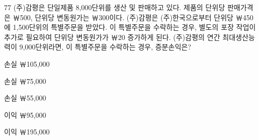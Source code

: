 \begin{question}{77}
(주)감평은 단일제품 8,000단위를 생산 및 판매하고 있다. 제품의 단위당 판매가격은 ￦500, 단위당 변동원가는 ￦300이다. (주)감평은 (주)한국으로부터 단위당 ￦450에 1,500단위의 특별주문을 받았다. 이 특별주문을 수락하는 경우, 별도의 포장 작업이 추가로 필요하여 단위당 변동원가가 ￦20 증가하게 된다. (주)감평의 연간 최대생산능력이 9,000단위라면, 이 특별주문을 수락하는 경우, 증분손익은?
\begin{choices}
  \item 손실 ￦105,000
  \item 손실 ￦75,000
  \item 손실 ￦55,000
  \item 이익 ￦95,000
  \item 이익 ￦195,000
\end{choices}
\end{question}
